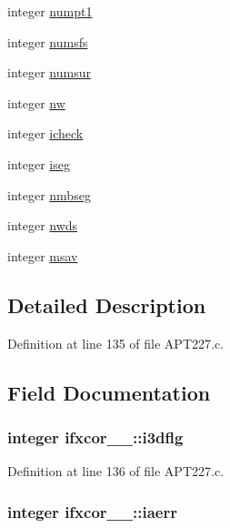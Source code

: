 \begin{DoxyCompactItemize}
integer \hyperlink{structifxcor__1___af05001c9c777c699d6c58201751af18e}{numpt1}
\item 
integer \hyperlink{structifxcor__1___a5b338114f5b85e207bd1bb9ab1728ab3}{numsfs}
\item 
integer \hyperlink{structifxcor__1___a4b930e3e0e24328d2fdb9a814ddd9736}{numsur}
\item 
integer \hyperlink{structifxcor__1___a676455bd535b7b905729642ce2287841}{nw}
\item 
integer \hyperlink{structifxcor__1___a18bbdb0a71498612f0d7cf3b03e326b0}{icheck}
\item 
integer \hyperlink{structifxcor__1___aced7e35e68f94176c8722e71cc133e8f}{iseg}
\item 
integer \hyperlink{structifxcor__1___a060bdb46de305b7daa001ca80ea91718}{nmbseg}
\item 
integer \hyperlink{structifxcor__1___aab2c6e13c35ae14d13b05033ea131920}{nwds}
\item 
integer \hyperlink{structifxcor__1___a3e9b4f6eb1024bd1376b17c5b0d96e29}{msav}
\end{DoxyCompactItemize}


\subsection{Detailed Description}


Definition at line 135 of file A\+P\+T227.\+c.



\subsection{Field Documentation}
\subsubsection[{\texorpdfstring{i3dflg}{i3dflg}}]{\setlength{\rightskip}{0pt plus 5cm}integer ifxcor\+\_\+\_\+\+::i3dflg}\hypertarget{structifxcor__1___a6ff8df3b134521b57b6c674e69656f9e}{}\label{structifxcor__1___a6ff8df3b134521b57b6c674e69656f9e}


Definition at line 136 of file A\+P\+T227.\+c.

\subsubsection[{\texorpdfstring{iaerr}{iaerr}}]{\setlength{\rightskip}{0pt plus 5cm}integer ifxcor\+\_\+\_\+\+::iaerr}\hypertarget{structifxcor__1___a10cf50c21fed443860fc1c49b90b6541}{}\label{structifxcor__1___a10cf50c21fed443860fc1c49b90b6541}


